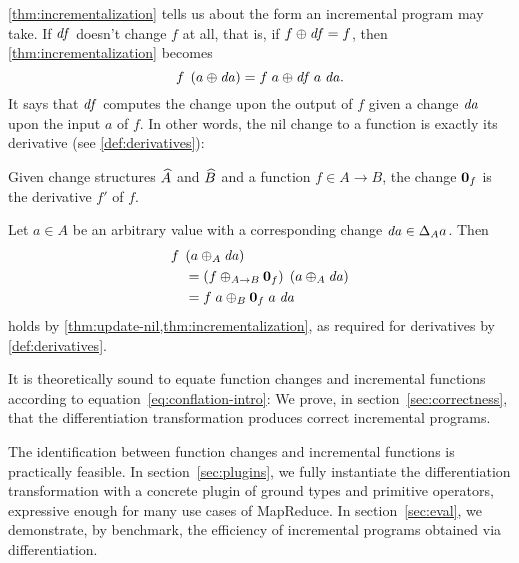 \cref{thm:incrementalization} tells us about the form an
incremental program may take. If $\mathit{df}$ doesn't change $f$
at all, that is, if
$
\Apply{\D f}{f}= f
$,
then \cref{thm:incrementalization} becomes
\[
 \App {f} {\Apply* {\D a} {a}}
 =
\Apply {\App {\App {\D f} {a}} {\D a}} {\App{f}{a}}.
\]
It says that $\mathit{df}$ computes the change upon the output of $f$ 
given a change $\mathit{da}$ upon the input $a$ of $f$. In
other words, the nil change to a function is exactly its
derivative (see \cref{def:derivatives}):


\begin{theorem}
  \label{thm:nil-is-derivative}
  Given change structures $\widehat{A}$ and $\widehat{B}$ and a function $f \in A \to B$,
  the change $\Nil[A \to B]{f}$ is the derivative $f'$ of $f$.
\end{theorem}

\begin{optionalproof}
  Let $a \in A$ be an arbitrary value with a corresponding change
  $\D a \in \Change[A]{a}$. Then
  \begin{align*}
    & \App{f}{\Apply*[A]{\D a}{a}}\\
    & \quad = \App{\Apply*[A \to B]{\Nil[A \to B]{f}}{f}}{\Apply*[A]{\D a}{a}}\\
    & \quad = \Apply[B]{\App{\App{\Nil[A]{f}}{a}}{\D a}}{\App{f}{a}}
  \end{align*}
  holds by \cref{thm:update-nil,thm:incrementalization}, as
  required for derivatives by \cref{def:derivatives}.
\end{optionalproof}

\begin{oldSec}

It is theoretically sound to equate function changes and
incremental functions according to
equation~\ref{eq:conflation-intro}: We prove, in
section~\ref{sec:correctness}, that the differentiation
transformation produces correct incremental programs.

The identification between function changes and incremental functions
is practically feasible. In section~\ref{sec:plugins}, we fully
instantiate the differentiation transformation with a concrete
plugin of ground types and primitive operators, expressive enough
for many use cases of MapReduce. In section~\ref{sec:eval}, we
demonstrate, by benchmark, the efficiency of incremental programs
obtained via differentiation.


\end{oldSec}


